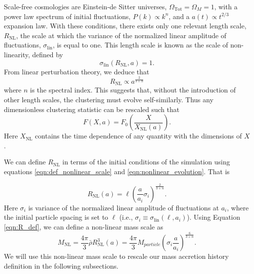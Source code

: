 Scale-free cosmologies are Einstein-de Sitter universes, $\Omega_{\mathrm{Tot}} = \Omega_{M} = 1$, with a power law spectrum of initial fluctuations, $P(k) \propto k^{n}$, and a $a(t) \propto t^{2/3}$ expansion law. With these conditions, there exists only one relevant length scale, $R_{\mathrm{NL}}$, the scale at which the variance of the normalized linear amplitude of fluctuations, $\sigma_{\mathrm{lin}}$, is equal to one. This length scale is known as the scale of non-linearity, defined by
\begin{equation}\label{eqn:def_nonlinear_scale}
    \sigma_{\mathrm{lin}}(R_{\mathrm{NL}},a) = 1.
\end{equation}
From linear perturbation theory, we deduce that
\begin{equation}\label{eqn:nonlinear_evolution}
    R_{\mathrm{NL}} \propto a^{\frac{2}{3+n}}
\end{equation}
where $n$ is the spectral index. This suggests that, without the introduction of other length scales, the clustering must evolve self-similarly. Thus any dimensionless clustering statistic can be rescaled such that
\begin{equation}\label{eqn:rescaling}
    F(X,a) = F_0\left(\frac{X}{X_{\mathrm{NL}}(a)}\right).
\end{equation}
Here $X_{\mathrm{NL}}$ contains the time dependence of any quantity with the dimensions of $X$.

We can define $R_{\mathrm{NL}}$ in terms of the initial conditions of the simulation using equations \ref{eqn:def_nonlinear_scale} and \ref{eqn:nonlinear_evolution}. That is

\begin{equation}\label{eqn:R_def}
    R_{\mathrm{NL}}(a) = \ell \left(\frac{a}{a_i} \sigma_i \right)^{\frac{2}{3+n}}.
\end{equation}
Here $\sigma_i$ is variance of the normalized linear amplitude of fluctuations at $a_i$, where the initial particle spacing is set to $\ell$ (i.e., $\sigma_i \equiv \sigma_{\mathrm{lin}}(\ell, a_i)$). Using Equation \ref{eqn:R_def}, we can define a non-linear mass scale as
\begin{equation}\label{eqn:nonlinearmass}
    M_{\mathrm{NL}} = \frac{4 \pi}{3} \bar{\rho} R_{\mathrm{NL}}^3(a) = \frac{4 \pi}{3} M_{particle} \left(\sigma_i \frac{a}{a_i}\right)^{\frac{6}{3+n}}.
\end{equation}
We will use this non-linear mass scale to rescale our mass accretion history definition in the following subsections.

